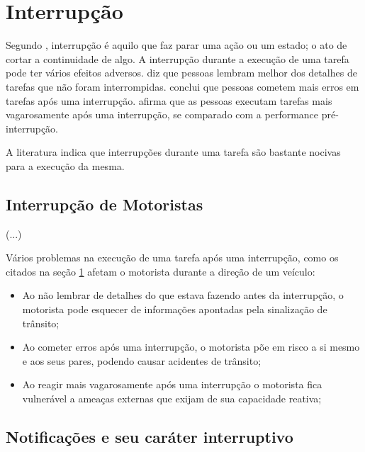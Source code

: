 \section{Interrupção}
\label{interrupcao}

Segundo \cite{ferreira2004novo}, interrupção é aquilo que faz parar uma ação ou um estado; o ato de cortar a continuidade de
algo. A interrupção durante a execução de uma tarefa pode ter vários efeitos adversos. \cite{lewin1927untersuchungen} diz
que pessoas lembram melhor dos detalhes de tarefas que não foram interrompidas. \cite{zijlstra1999temporal} conclui que
pessoas cometem mais erros em tarefas após uma interrupção. \cite{gillie1989makes} afirma que as pessoas executam tarefas
mais vagarosamente após uma interrupção, se comparado com a performance pré-interrupção.

A literatura indica que interrupções durante uma tarefa são bastante nocivas para a execução da mesma.

\subsection{Interrupção de Motoristas}
\label{interrupcao-motoristas}

(...)

Vários problemas na execução de uma tarefa após uma interrupção, como os citados na seção \ref{interrupcao} afetam o
motorista durante a direção de um veículo:

\begin{itemize}
  \item Ao não lembrar de detalhes do que estava fazendo antes da interrupção, o motorista pode esquecer de informações
  apontadas pela sinalização de trânsito;
  \item Ao cometer erros após uma interrupção, o motorista põe em risco a si mesmo e aos seus pares, podendo causar acidentes
  de trânsito;
  \item Ao reagir mais vagarosamente após uma interrupção o motorista fica vulnerável a ameaças externas que exijam de sua
  capacidade reativa;
\end{itemize}


\subsection{Notificações e seu caráter interruptivo}
\label{notificacao}

